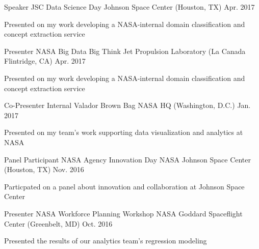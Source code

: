 \begin{cventries}
  \cventry
    {Speaker} %
    {JSC Data Science Day} %
    {Johnson Space Center (Houston, TX)} %
    {Apr. 2017} %
    {
      \begin{cvitems} %
        \item {Presented on my work developing a NASA-internal domain classification and concept extraction service}
      \end{cvitems}
    }
    
  \cventry
    {Presenter} %
    {NASA Big Data Big Think} %
    {Jet Propulsion Laboratory (La Canada Flintridge, CA)} %
    {Apr. 2017} %
    {
      \begin{cvitems} %
        \item {Presented on my work developing a NASA-internal domain classification and concept extraction service}
      \end{cvitems}
    }


  \cventry
    {Co-Presenter} %
    {Internal Valador Brown Bag} %
    {NASA HQ (Washington, D.C.)} %
    {Jan. 2017} %
    {
      \begin{cvitems} %
        \item {Presented on my team's work supporting data visualization and analytics at NASA}
      \end{cvitems}
    }

  \cventry
    {Panel Participant} %
    {NASA Agency Innovation Day} %
    {NASA Johnson Space Center (Houston, TX)} %
    {Nov. 2016} %
    {
      \begin{cvitems} %
        \item {Particpated on a panel about innovation and collaboration at Johnson Space Center}
      \end{cvitems}
    }

  \cventry
    {Presenter} %
    {NASA Workforce Planning Workshop} %
    {NASA Goddard Spaceflight Center (Greenbelt, MD)} %
    {Oct. 2016} %
    {
      \begin{cvitems} %
        \item {Presented the results of our analytics team's regression modeling}
      \end{cvitems}
    }
    

\end{cventries}
